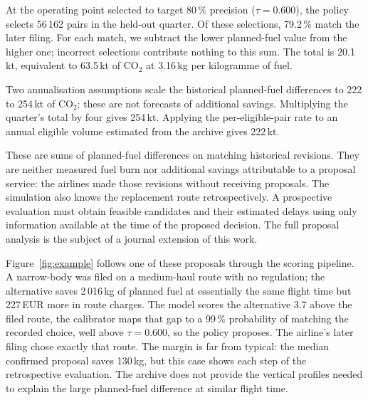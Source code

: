 \documentclass[a4paper,conference]{IEEEtran}
\begin{document}
At the operating point selected to target 80\,\% precision
($\tau=0.600$), the policy selects 56\,162 pairs in the held-out
quarter. Of these selections, 79.2\,\% match the later filing.
For each match, we subtract the lower planned-fuel value from the higher
one; incorrect selections contribute nothing to this sum. The total is
20.1\,kt, equivalent to 63.5\,kt of CO$_2$ at 3.16\,kg per kilogramme
of fuel.

Two annualisation assumptions scale the historical planned-fuel
differences to 222 to 254\,kt of CO$_2$; these are not forecasts of
additional savings. Multiplying the quarter's total by four gives
254\,kt. Applying the per-eligible-pair rate to an annual eligible
volume estimated from the archive gives 222\,kt.

These are sums of planned-fuel differences on matching historical
revisions. They are neither measured fuel burn nor additional savings
attributable to a proposal service: the airlines made those revisions
without receiving proposals. The simulation also knows the replacement
route retrospectively. A prospective evaluation must obtain feasible
candidates and their estimated delays using only information available
at the time of the proposed decision. The full proposal analysis is the subject of a journal extension of
this work.

Figure~\ref{fig:example} follows one of these proposals through the
scoring pipeline. A narrow-body was filed on a medium-haul route with no
regulation; the alternative saves 2\,016\,kg of planned fuel at
essentially the same flight time but 227\,EUR more in route charges. The
model scores the alternative 3.7 above the filed route, the calibrator
maps that gap to a 99\,\% probability of matching the recorded choice, well above
$\tau = 0.600$, so the policy proposes. The airline's later filing
chose exactly that route. The margin is far from typical: the median
confirmed proposal saves 130\,kg, but this case shows each step of the retrospective evaluation. The
archive does not provide the vertical profiles needed to explain the
large planned-fuel difference at similar flight time.
\end{document}
